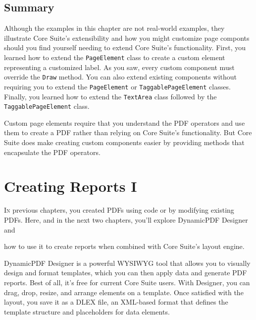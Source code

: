 \documentclass[american]{tufte-book}
\numberwithin{equation}{section}
\numberwithin{figure}{section}
\def\color#1{}%
\begin{document}
{{\begin{figure}
\end{figure}
\section{Summary}
Although the examples in this chapter are not real-world examples, they illustrate Core Suite's extensibility and how you might customize page componts should you find yourself needing to extend Core Suite's functionality. First, you learned how to extend the \texttt{PageElement} class to create a custom element representing a customized label. As you saw, every custom component must override the \texttt{Draw} method. You can also extend existing components without requiring you to extend the \texttt{PageElement} or \texttt{TaggablePageElement} classes.  Finally, you learned how to extend the \texttt{TextArea} class followed by the \texttt{TaggablePageElement} class.

Custom page elements require that you understand the PDF operators and use them to create a PDF rather than relying on Core Suite's functionality. But Core Suite does make creating custom components easier by providing methods that encapsulate the PDF operators. 

\color{white}
\chapter{Creating Reports I}\label{chap:report-layout-data}
\color{black}
\BgThispage
\vspace{8.00em}
\lettrine[lines=2,lhang=0.1]{I}{n} previous chapters, you created PDFs using code or by modifying existing
PDFs. Here, and in the next two chapters, you'll explore DynamicPDF Designer
and

 how to use it to create reports when combined with Core Suite's layout engine. 

DynamicPDF Designer is a powerful WYSIWYG tool that allows you to
visually design and format templates, which you can then apply data and generate PDF reports. Best of all, it's free for current
Core Suite users. With Designer, you can drag, drop, resize, and arrange
elements on a template. Once satisfied with the layout, you save it
as a DLEX file, an XML-based format that defines the template structure
and placeholders for data elements.

}}
\end{document}
